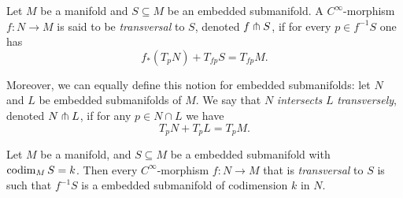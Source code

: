 \begin{definition}
\label{def:transversal-smooth-morphism}
Let \(M\) be a manifold and \(S \subseteq M\) be an embedded submanifold. A
\(C^{\infty}\)-morphism \(f: N \to M\) is said to be \emph{transversal} to
\(S\), denoted \(f \pitchfork S\), if for every \(p \in f^{-1} S\) one has
\[
f_{*}(T_p N) + T_{f p} S = T_{f p} M.
\]

Moreover, we can equally define this notion for embedded submanifolds: let \(N\)
and \(L\) be embedded submanifolds of \(M\). We say that \(N\) \emph{intersects}
\(L\) \emph{transversely}, denoted \(N \pitchfork L\), if for any \(p \in N \cap L\)
we have
\[
T_p N + T_p L = T_p M.
\]
\end{definition}

\begin{theorem}[Transversality]
\label{thm:transversality-theorem}
Let \(M\) be a manifold, and \(S \subseteq M\) be a embedded submanifold with
\(\operatorname{codim}_M S = k\). Then every \(C^{\infty}\)-morphism \(f: N \to M\) that is
\emph{transversal} to \(S\) is such that \(f^{-1} S\) is a embedded submanifold
of codimension \(k\) in \(N\).
\end{theorem}

